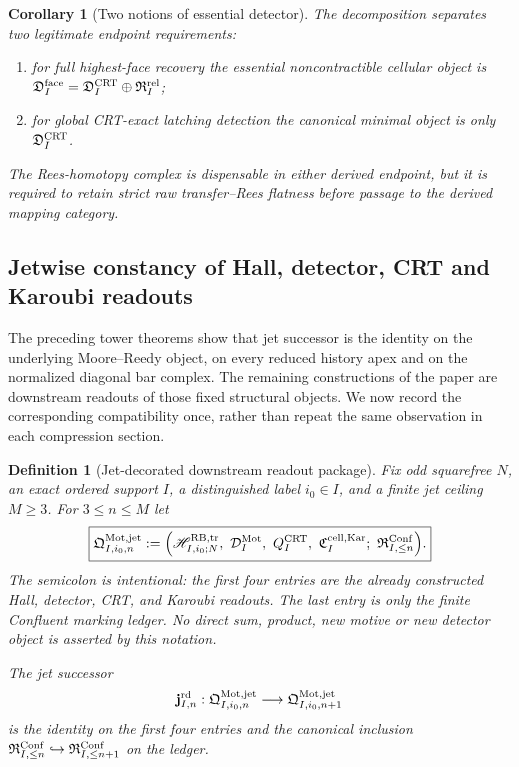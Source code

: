 \documentclass[11pt]{article}
\newtheorem{corollary}[theorem]{Corollary}
\newtheorem{definition}[theorem]{Definition}
\theoremstyle{remark}
\newcommand{\Mot}{\mathrm{Mot}}
\begin{document}
\begin{corollary}[Two notions of essential detector]
\label{P2M-cor:two-essential-detector-notions}
The decomposition separates two legitimate endpoint requirements:
\begin{enumerate}[label=\textup{(\roman*)}]
\item for full highest-face recovery the essential noncontractible cellular
      object is
      \(\mathfrak D_I^{\rm face}
        =\mathfrak D_I^{\rm CRT}\oplus\mathfrak R_I^{\rm rel}\);
\item for global CRT-exact latching detection the canonical minimal object is
      only \(\mathfrak D_I^{\rm CRT}\).
\end{enumerate}
The Rees-homotopy complex is dispensable in either derived endpoint, but it is
required to retain strict raw transfer--Rees flatness before passage to the
derived mapping category.
\end{corollary}


\subsection{Jetwise constancy of Hall, detector, CRT and Karoubi readouts}
\label{P2M-sec:v37-readout-jet-constancy}

The preceding tower theorems show that jet successor is the identity on the
underlying Moore--Reedy object, on every reduced history apex and on the
normalized diagonal bar complex.  The remaining constructions of the paper
are downstream readouts of those fixed structural objects.  We now record the
corresponding compatibility once, rather than repeat the same observation in
each compression section.

\begin{definition}[Jet-decorated downstream readout package]
\label{P2M-def:v37-jet-readout-package}
Fix odd squarefree $N$, an exact ordered support $I$, a distinguished label
$i_0\in I$, and a finite jet ceiling $M\ge3$.  For $3\le n\le M$ let
\begin{equation}\label{P2M-eq:v37-jet-readout-package}
 \boxed{
 \mathfrak Q_{I,i_0,n}^{\Mot,\mathrm{jet}}
 :=\Bigl(
   \mathscr H_{I,i_0;N}^{\mathrm{RB,tr}},\
   \mathcal D_I^{\Mot},\
   Q_I^{\rm CRT},\
   \mathfrak C_I^{\rm cell,Kar};\
   \mathfrak R^{\rm Conf}_{I,\le n}
 \Bigr).}
\end{equation}
The semicolon is intentional: the first four entries are the already constructed
Hall, detector, CRT, and Karoubi readouts.  The last entry is only the finite
Confluent marking ledger.  No direct sum, product, new motive or new detector
object is asserted by this notation.

The jet successor
\begin{equation}\label{P2M-eq:v37-readout-jet-successor}
 \mathbf j^{\rm rd}_{I,n}:
 \mathfrak Q_{I,i_0,n}^{\Mot,\mathrm{jet}}
 \longrightarrow
 \mathfrak Q_{I,i_0,n+1}^{\Mot,\mathrm{jet}}
\end{equation}
is the identity on the first four entries and the canonical inclusion
$\mathfrak R^{\rm Conf}_{I,\le n}\hookrightarrow
\mathfrak R^{\rm Conf}_{I,\le n+1}$ on the ledger.
\end{definition}
\end{document}
